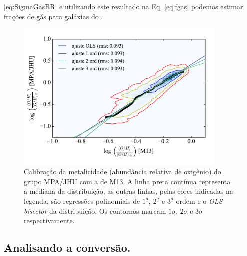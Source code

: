 \ref{eq:SigmaGasBR} e utilizando este resultado na Eq. \ref{eq:fgas} podemos estimar frações de
gás para galáxias do \CAL. 
\begin{figure}
	\centering
	\includegraphics[width=0.9\textwidth]{figuras/logOH_ZnebMPA.pdf}
	\caption[Calibração das metalicidades.]
	{Calibração da metalicidade (abundância relativa de oxigênio) do grupo MPA/JHU com a de M13. A
linha preta contínua representa a mediana da distribuição, as outras linhas, pelas cores indicadas
na legenda, são regressões polinomiais de $1^\underline{a}$, $2^\underline{a}$ e $3^\underline{a}$
ordem e o {\em OLS bisector} da distribuição. Os contornos marcam $1\sigma$, $2\sigma$ e $3\sigma$
respectivamente.}
	\label{fig:calibZ}
\end{figure}

\subsection{Analisando a conversão.}
\label{sec:gasfrac:gas2dust:analise}

